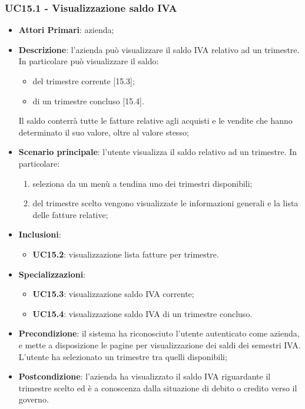 \subsubsection{UC15.1 - Visualizzazione saldo IVA}
\begin{itemize}
	\item \textbf{Attori Primari}: azienda;
	\item \textbf{Descrizione}: l'azienda può visualizzare il saldo IVA relativo ad un trimestre. In particolare può visualizzare il saldo:
	\begin{itemize}
		\item del trimestre corrente [15.3];
		\item di un trimestre concluso [15.4].
	\end{itemize}
	Il saldo conterrà tutte le fatture relative agli acquisti e le vendite che hanno determinato il suo valore, oltre al valore stesso;
	\item \textbf{Scenario principale}: l'utente visualizza il saldo relativo ad un trimestre. In particolare:
	\begin{enumerate}[label=\alph*.]
		\item seleziona da un menù a tendina uno dei trimestri disponibili;
		\item del trimestre scelto vengono visualizzate le informazioni generali e la lista delle fatture relative;
	\end{enumerate}
	\item \textbf{Inclusioni}: 
	\begin{itemize}
		\item \textbf{UC15.2}: visualizzazione lista fatture per trimestre.
	\end{itemize}
	\item \textbf{Specializzazioni}: 
	\begin{itemize}
		\item \textbf{UC15.3}: visualizzazione saldo IVA corrente;
		\item \textbf{UC15.4}:  visualizzazione saldo IVA di un trimestre concluso.
	\end{itemize}
	\item \textbf{Precondizione}: il sistema ha riconosciuto l'utente autenticato come azienda, e mette a disposizione le pagine per visualizzazione dei saldi dei semestri IVA. L'utente ha selezionato un trimestre tra quelli disponibili;
	\item \textbf{Postcondizione}: l'azienda ha visualizzato il saldo IVA riguardante il trimestre scelto ed è a conoscenza dalla situazione di debito o credito verso il governo.
\end{itemize} 

